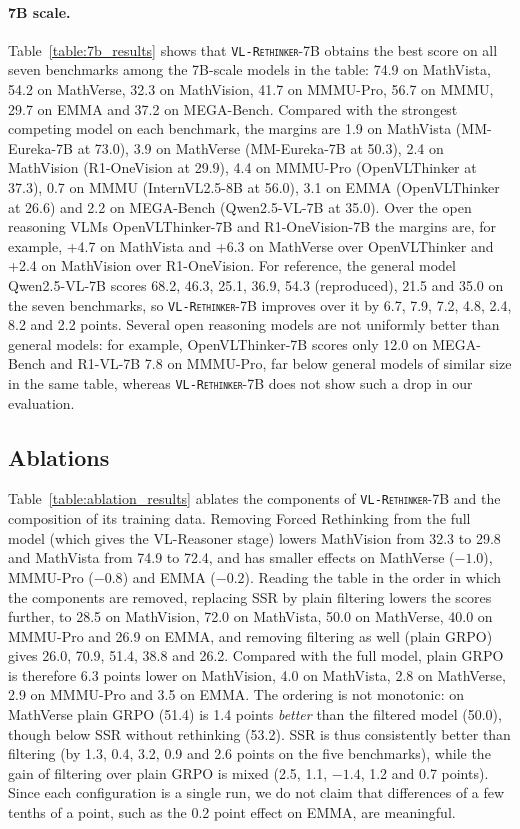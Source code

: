 \documentclass{article}
\newcommand{\model}{\texttt{\textsc{VL-Rethinker}}\xspace}
\begin{document}
\paragraph{7B scale.} Table~\ref{table:7b_results} shows that \model-7B obtains the best score on all seven benchmarks among the 7B-scale models in the table: 74.9 on MathVista, 54.2 on MathVerse, 32.3 on MathVision, 41.7 on MMMU-Pro, 56.7 on MMMU, 29.7 on EMMA and 37.2 on MEGA-Bench. Compared with the strongest competing model on each benchmark, the margins are 1.9 on MathVista (MM-Eureka-7B at 73.0), 3.9 on MathVerse (MM-Eureka-7B at 50.3), 2.4 on MathVision (R1-OneVision at 29.9), 4.4 on MMMU-Pro (OpenVLThinker at 37.3), 0.7 on MMMU (InternVL2.5-8B at 56.0), 3.1 on EMMA (OpenVLThinker at 26.6) and 2.2 on MEGA-Bench (Qwen2.5-VL-7B at 35.0). Over the open reasoning VLMs OpenVLThinker-7B and R1-OneVision-7B the margins are, for example, +4.7 on MathVista and +6.3 on MathVerse over OpenVLThinker and +2.4 on MathVision over R1-OneVision. For reference, the general model Qwen2.5-VL-7B scores 68.2, 46.3, 25.1, 36.9, 54.3 (reproduced), 21.5 and 35.0 on the seven benchmarks, so \model-7B improves over it by 6.7, 7.9, 7.2, 4.8, 2.4, 8.2 and 2.2 points. Several open reasoning models are not uniformly better than general models: for example, OpenVLThinker-7B scores only 12.0 on MEGA-Bench and R1-VL-7B 7.8 on MMMU-Pro, far below general models of similar size in the same table, whereas \model-7B does not show such a drop in our evaluation.



\subsection{Ablations}
\label{sec:ablation}

Table~\ref{table:ablation_results} ablates the components of \model-7B and the composition of its training data. Removing Forced Rethinking from the full model (which gives the VL-Reasoner stage) lowers MathVision from 32.3 to 29.8 and MathVista from 74.9 to 72.4, and has smaller effects on MathVerse ($-1.0$), MMMU-Pro ($-0.8$) and EMMA ($-0.2$). Reading the table in the order in which the components are removed, replacing SSR by plain filtering lowers the scores further, to 28.5 on MathVision, 72.0 on MathVista, 50.0 on MathVerse, 40.0 on MMMU-Pro and 26.9 on EMMA, and removing filtering as well (plain GRPO) gives 26.0, 70.9, 51.4, 38.8 and 26.2. Compared with the full model, plain GRPO is therefore 6.3 points lower on MathVision, 4.0 on MathVista, 2.8 on MathVerse, 2.9 on MMMU-Pro and 3.5 on EMMA. The ordering is not monotonic: on MathVerse plain GRPO (51.4) is 1.4 points \emph{better} than the filtered model (50.0), though below SSR without rethinking (53.2). SSR is thus consistently better than filtering (by 1.3, 0.4, 3.2, 0.9 and 2.6 points on the five benchmarks), while the gain of filtering over plain GRPO is mixed (2.5, 1.1, $-1.4$, 1.2 and 0.7 points). Since each configuration is a single run, we do not claim that differences of a few tenths of a point, such as the 0.2 point effect on EMMA, are meaningful.
\end{document}
